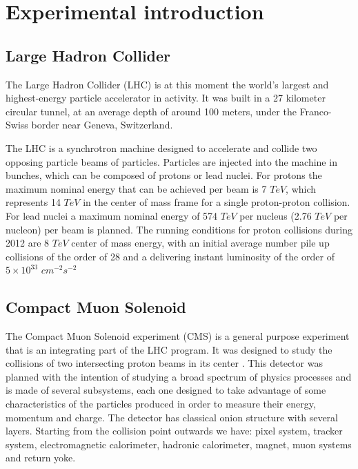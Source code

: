 \documentclass[%
reprint,
amsmath,
amssymb,
aps,
pra,
showkeys
]{revtex4-1}
\begin{document}
\section{Experimental introduction}

\subsection{Large Hadron Collider}

The Large Hadron Collider (LHC) is at this moment the world's largest and highest-energy particle accelerator
in activity. It was built in a 27 kilometer circular tunnel, at an average depth of around 100 meters, under the
Franco-Swiss border near Geneva, Switzerland\cite{Bruning:2004ej}.

The LHC is a synchrotron machine designed to accelerate and collide two opposing particle beams of particles.
Particles are injected into the machine in bunches, which can be composed of protons or lead nuclei. For
protons the maximum nominal energy that can be achieved per beam is 7 $TeV$, which represents 14 $TeV$ in the
center of mass frame for a single proton-proton collision. For lead nuclei a maximum nominal energy of
574 $TeV$ per nucleus (2.76 $TeV$ per nucleon) per beam is planned. The running conditions for proton collisions
during 2012 are 8 $TeV$ center of mass energy, with an initial average number pile up collisions
of the order of 28 and a delivering instant luminosity of the order of $5 \times 10^{33}$ $cm^{-2}s^{-2}$

\subsection{Compact Muon Solenoid}

The Compact Muon Solenoid experiment (CMS) is a general purpose experiment that is an integrating part of the LHC
program. It was designed to study the collisions of two intersecting proton beams in its center \cite{article:CMSTDRv12006}.
This detector was planned with the intention of studying a broad spectrum of physics processes and is made of several
subsystems, each one designed to take advantage of some characteristics of the particles produced in order to
measure their energy, momentum and charge. The detector has classical onion structure with several layers. Starting
from the collision point outwards we have: pixel system, tracker system, electromagnetic calorimeter, 
hadronic calorimeter, magnet, muon systems and return yoke.
\end{document}

